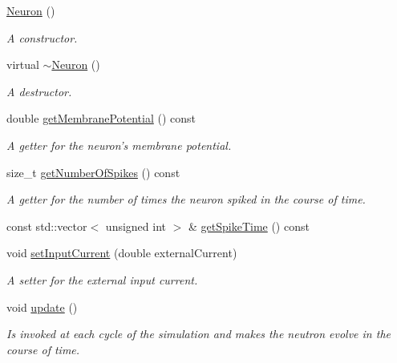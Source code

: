 \begin{DoxyCompactItemize}
\item 
\hypertarget{classNeuron_a823487d01615fadb8ac19a2768dd9d96}{\hyperlink{classNeuron_a823487d01615fadb8ac19a2768dd9d96}{Neuron} ()}\label{classNeuron_a823487d01615fadb8ac19a2768dd9d96}

\begin{DoxyCompactList}\small\item\em A constructor. \end{DoxyCompactList}\item 
\hypertarget{classNeuron_a94a250ce7e167760e593979b899745b1}{virtual \hyperlink{classNeuron_a94a250ce7e167760e593979b899745b1}{$\sim$\-Neuron} ()}\label{classNeuron_a94a250ce7e167760e593979b899745b1}

\begin{DoxyCompactList}\small\item\em A destructor. \end{DoxyCompactList}\item 
double \hyperlink{classNeuron_a86341dee7a81765fe4840777a008c688}{get\-Membrane\-Potential} () const 
\begin{DoxyCompactList}\small\item\em A getter for the neuron's membrane potential. \end{DoxyCompactList}\item 
size\-\_\-t \hyperlink{classNeuron_a9497c01c1513b480cb96488e104c8b00}{get\-Number\-Of\-Spikes} () const 
\begin{DoxyCompactList}\small\item\em A getter for the number of times the neuron spiked in the course of time. \end{DoxyCompactList}\item 
const std\-::vector$<$ unsigned int $>$ \& \hyperlink{classNeuron_ae87bb09d99e4e9c2185be8b73fc242ba}{get\-Spike\-Time} () const 
\item 
void \hyperlink{classNeuron_ae77210c7b0bf3739b01ec2e3dba96827}{set\-Input\-Current} (double external\-Current)
\begin{DoxyCompactList}\small\item\em A setter for the external input current. \end{DoxyCompactList}\item 
void \hyperlink{classNeuron_a782b3b728eee5097ab205a7a7990225b}{update} ()
\begin{DoxyCompactList}\small\item\em Is invoked at each cycle of the simulation and makes the neutron evolve in the course of time. \end{DoxyCompactList}\item 

\end{DoxyCompactItemize}
